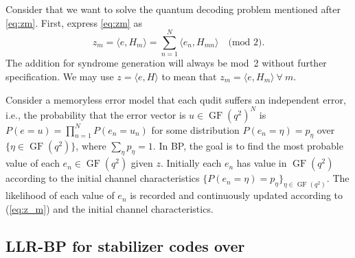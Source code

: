 \documentclass{ieeeaccess}
\DeclareMathOperator{\GF}{GF}
\newcommand{\sC}{{\cal C}}
\newcommand{\sG}{{\cal G}}
\newcommand{\sS}{{\cal S}}
\let\emph\textit
\theoremstyle{definition}		%
\begin{document}
%
Consider that we want to solve the quantum decoding problem mentioned after \eqref{eq:zm}.
First, express \eqref{eq:zm} as
\begin{equation} \label{eq:z_m}
z_m = \langle e,H_m \rangle = \textstyle \sum_{n=1}^N \langle e_n, H_{mn} \rangle  \quad \text{(mod 2)}.
\end{equation}
The addition  for syndrome generation will always be mod~2 without further specification.
We may use $z = \langle e,H \rangle$ to mean that $z_m = \langle e,H_m \rangle ~\forall~ m$.
%

Consider a memoryless error model that each qudit suffers an independent error, 
i.e., the probability that the error vector is $u\in\GF(q^2)^N$ is $P(e=u) = \prod_{n=1}^N P(e_n=u_n)$
for some distribution ${P(e_n=\eta)=p_\eta}$ over $\{\eta\in \GF(q^2)\}$,  %
where ${\sum_\eta p_\eta = 1}$.
In BP, the goal is to find the most probable value of each $e_n\in\GF(q^2)$ given $z$. 
Initially each $e_n$ has value in $\GF(q^2)$ according to the initial channel characteristics ${ \{P(e_n=\eta) = p_\eta\}_{\eta\in\GF(q^2)} }$. 
The likelihood of each value of $e_n$ is recorded and continuously updated according to (\ref{eq:z_m}) and the initial channel characteristics.


 
\subsection{LLR-BP for stabilizer codes over \GFtwol} \label{sec:alg}	%
\end{document}
